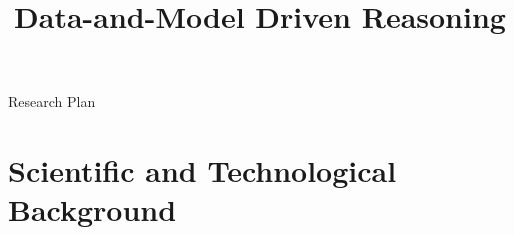 \documentclass[12pt]{article}
\newcommand{\note}[1]{\textbf{\textit{#1}}}
\begin{document}
\title{Data-and-Model Driven Reasoning}

\begin{center}
\LARGE{Research Plan}
\end{center}

\section{Scientific and Technological Background}







\end{document}
